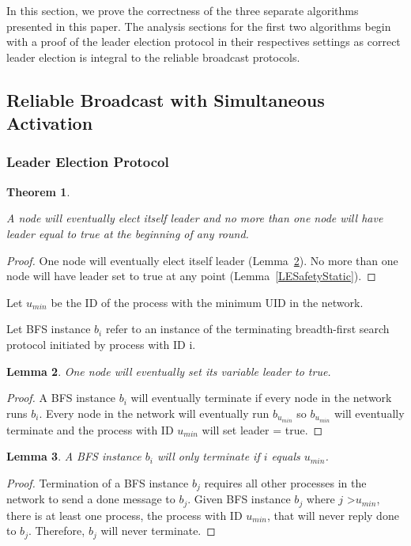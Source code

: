 \documentclass[english]{article}
\newtheorem{theorem}{Theorem}[section]
\newtheorem{lemma}[theorem]{Lemma}
\begin{document}
In this section, we prove the correctness of the three separate algorithms presented in this paper. The analysis sections for the first two algorithms begin with a proof of the leader election protocol in their respectives settings as correct leader election is integral to the reliable broadcast protocols.

\subsection {Reliable Broadcast with Simultaneous Activation}

\subsubsection{Leader Election Protocol}

\begin{theorem}
\label{LeaderElectionStatic}

A node will eventually elect itself leader and no more than one node will have leader equal to true at the beginning of any round. 
\end{theorem}
\begin{proof}
One node will eventually elect itself leader (Lemma~\ref{LELivenessStatic}).
No more than one node will have leader set to true at any point (Lemma~\ref{LESafetyStatic}).
\end{proof}

\begin{definition}
Let $u_{min}$ be the ID of the process with the minimum UID in the network. 
\end{definition}

\begin{definition}
Let BFS instance $b_i$ refer to an instance of the terminating breadth-first search protocol initiated by process with ID i.
\end{definition}

\begin{lemma}
\label{LELivenessStatic}
  One node will eventually set its variable leader to true.
\end{lemma}
\begin{proof}
A BFS instance $b_i$ will eventually terminate if every node in the network runs $b_i$. 
Every node in the network will eventually run $b_{u_{min}}$ so $b_{u_{min}}$ will eventually terminate and the process with ID $u_{min}$ will set leader = true.
\end{proof}

\begin{lemma}
\label{BFSTermination}
  A BFS instance $b_i$ will only terminate if $i$ equals $u_{min}$.
\end{lemma}
\begin{proof}
Termination of a BFS instance $b_j$ requires all other processes in the network to send a done message to $b_j$.
Given BFS instance $b_j$ where $j$ \textgreater $u_{min}$, there is at least one process, the process with ID $u_{min}$, that will never reply done to $b_j$.
Therefore, $b_j$ will never terminate.
\end{proof}
\end{document}
